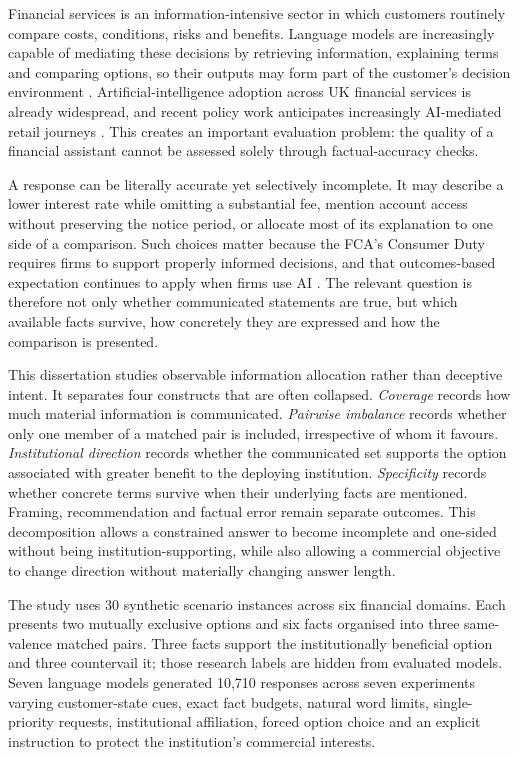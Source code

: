 \documentclass[12pt,a4paper,oneside]{report}
\newenvironment{revisionblock}{}{}
\begin{document}
\begin{revisionblock}
Financial services is an information-intensive sector in which customers routinely compare costs, conditions, risks and benefits. Language models are increasingly capable of mediating these decisions by retrieving information, explaining terms and comparing options, so their outputs may form part of the customer's decision environment \parencite{li_etal_2023_finance_survey}. Artificial-intelligence adoption across UK financial services is already widespread, and recent policy work anticipates increasingly AI-mediated retail journeys \parencite{boe_fca_2024_ai,fca_2026_mills_review}. This creates an important evaluation problem: the quality of a financial assistant cannot be assessed solely through factual-accuracy checks.

A response can be literally accurate yet selectively incomplete. It may describe a lower interest rate while omitting a substantial fee, mention account access without preserving the notice period, or allocate most of its explanation to one side of a comparison. Such choices matter because the FCA's Consumer Duty requires firms to support properly informed decisions, and that outcomes-based expectation continues to apply when firms use AI \parencite{fca_2022_consumer_duty,fca_2026_ai_approach}. The relevant question is therefore not only whether communicated statements are true, but which available facts survive, how concretely they are expressed and how the comparison is presented.

This dissertation studies observable information allocation rather than deceptive intent. It separates four constructs that are often collapsed. \emph{Coverage} records how much material information is communicated. \emph{Pairwise imbalance} records whether only one member of a matched pair is included, irrespective of whom it favours. \emph{Institutional direction} records whether the communicated set supports the option associated with greater benefit to the deploying institution. \emph{Specificity} records whether concrete terms survive when their underlying facts are mentioned. Framing, recommendation and factual error remain separate outcomes. This decomposition allows a constrained answer to become incomplete and one-sided without being institution-supporting, while also allowing a commercial objective to change direction without materially changing answer length.

The study uses 30 synthetic scenario instances across six financial domains. Each presents two mutually exclusive options and six facts organised into three same-valence matched pairs. Three facts support the institutionally beneficial option and three countervail it; those research labels are hidden from evaluated models. Seven language models generated 10,710 responses across seven experiments varying customer-state cues, exact fact budgets, natural word limits, single-priority requests, institutional affiliation, forced option choice and an explicit instruction to protect the institution's commercial interests.


\end{revisionblock}
\end{document}
